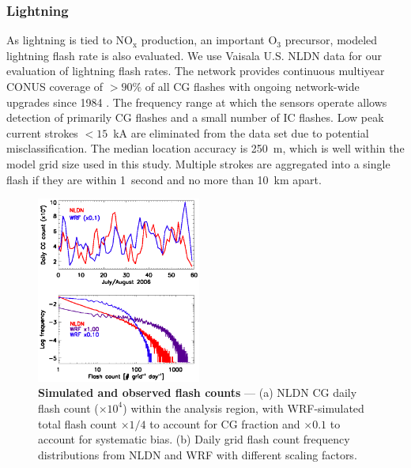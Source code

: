 \subsubsection{Lightning}

As lightning is tied to $\mathrm{NO_x}$ production, an important O$_3$ precursor,
modeled lightning flash rate is also evaluated.
We use Vaisala U.S. NLDN data for our evaluation of lightning flash
rates. The network provides continuous multiyear CONUS coverage of $>90\%$ of all CG
flashes with ongoing network-wide upgrades since 1984 \citep{Orville:2002uq,Orville:2010uq}.
The frequency range at which the sensors operate allows detection of primarily CG flashes
and a small number of IC flashes. Low peak current strokes $<15$~kA are eliminated from
the data set due to potential misclassification. The median location accuracy is 250~m, which
is well within the model grid size used in this study.
Multiple strokes are aggregated into a single flash if they are within 1~second and no more
than 10~km apart.

\begin{figure}
	\centering
	\begin{singlespacing}
	\includegraphics[width=0.48\textwidth]{Figures/ltng_dist.eps}
	\caption[Simulated and observed flash counts]{{\small\textbf{Simulated and observed flash counts} ---
	(a) NLDN CG daily flash count ($\times10^4$) within the analysis region, with WRF-simulated total flash count $\times1/4$ to
	account for CG fraction and $\times0.1$ to account for systematic bias. (b) Daily grid flash count frequency distributions from
	NLDN and WRF with different scaling factors.}}
	\label{fig:lightning}
	\end{singlespacing}
\end{figure}


